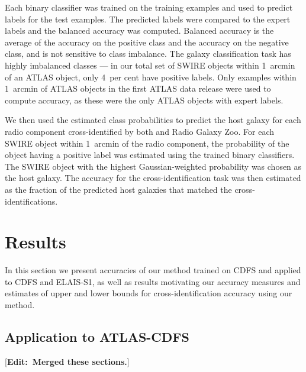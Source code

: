 \documentclass[fleqn,usenatbib,usedcolumn]{mnras}
\newcommand{\edit}[1]{ {\color{red}[{\bf Edit:~{#1}}]} }
\begin{document}
    Each binary classifier was trained on the training examples and used to predict labels for the test examples. The predicted labels were compared to the expert labels and the balanced accuracy was computed. Balanced accuracy is the average of the accuracy on the positive class and the accuracy on the negative class, and is not sensitive to class imbalance. The galaxy classification task has highly imbalanced classes --- in our total set of SWIRE objects within 1~arcmin of an ATLAS object, only 4~per cent have positive labels. Only examples within 1~arcmin of ATLAS objects in the first ATLAS data release \citep{norris06} were used to compute accuracy, as these were the only ATLAS objects with expert labels.

    We then used the estimated class probabilities to predict the host galaxy for
    each radio component cross-identified by both \citet{norris06} and Radio
    Galaxy Zoo. For each SWIRE object within 1~arcmin of the radio component,
    the probability of the object having a positive label was estimated using
    the trained binary classifiers. The SWIRE object with the highest Gaussian-weighted
    probability was chosen as the host galaxy. The accuracy for the cross-identification task was then estimated
    as the fraction of the predicted host galaxies that matched the \citet{norris06} cross-identifications.

\section{Results}\label{sec:results}

  In this section we present accuracies of our method trained on CDFS and applied to CDFS and ELAIS-S1, as well as results motivating our accuracy
  measures and estimates of upper and lower bounds for cross-identification accuracy using our method.

  \subsection{Application to ATLAS-CDFS}

    \edit{Merged these sections.}
\end{document}
